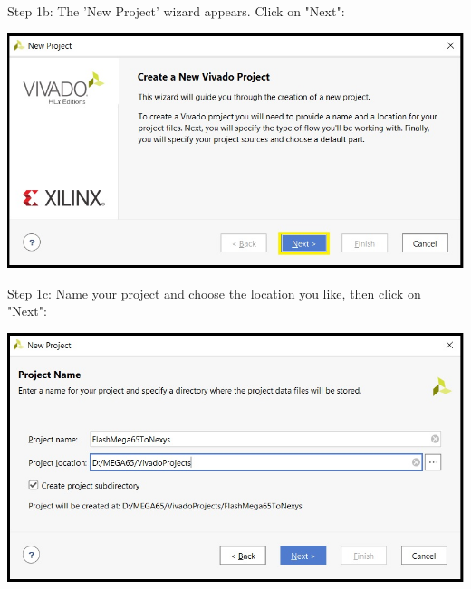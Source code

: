 \vspace{5mm}

\begin{minipage}{\linewidth}
  Step 1b: The 'New Project' wizard appears. Click on "Next": \\
  \begin{center}
    \includegraphics[width=0.8\linewidth]{images/vivado01b.png}
  \end{center}
\end{minipage}

\begin{minipage}{\linewidth}
  Step 1c: Name your project and choose the location you like, then click on "Next":\\
  \begin{center}
    \includegraphics[width=0.8\linewidth]{images/vivado01c.png}
  \end{center}
\end{minipage}

\vspace{5mm}

